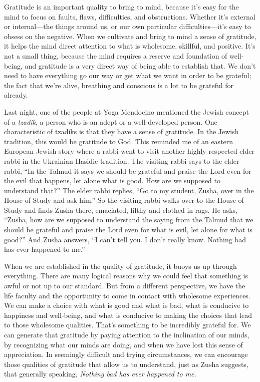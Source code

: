 Gratitude is an important quality to bring to mind, because it's easy 
for the mind to focus on faults, flaws, difficulties, and obstructions. 
Whether it's external or internal---the things around us, or our own 
particular difficulties---it's easy to obsess on the negative. When we 
cultivate and bring to mind a sense of gratitude, it helps the mind 
direct attention to what is wholesome, skillful, and positive. It's not 
a small thing, because the mind requires a reserve and foundation of 
well-being, and gratitude is a very direct way of being able to 
establish that. We don't need to have everything go our way or get what 
we want in order to be grateful; the fact that we're alive, breathing 
and conscious is a lot to be grateful for already.

Last night, one of the people at Yoga Mendocino mentioned the Jewish 
concept of a \emph{tzadik}, a person who is an adept or a 
well-developed person. One characteristic of tzadiks is that they have 
a sense of gratitude. In the Jewish tradition, this would be gratitude 
to God. This reminded me of an eastern European Jewish story where a 
rabbi went to visit another highly respected elder rabbi in the 
Ukrainian Hasidic tradition. The visiting rabbi says to the elder 
rabbi, ``In the Talmud it says we should be grateful and praise the 
Lord even for the evil that happens, let alone what is good. How are we 
supposed to \mbox{understand} that?'' The elder rabbi replies, ``Go to my 
student, Zusha, over in the House of Study and ask him.'' So the 
visiting rabbi walks over to the House of Study and finds Zusha there, 
emaciated, filthy and clothed in rags. He asks, ``Zusha, how are we 
supposed to understand the saying from the Talmud that we should be 
grateful and praise the Lord even for what is evil, let alone for what 
is good?'' And Zusha answers, ``I can't tell you. I don't really know. 
Nothing bad has ever happened to me.''

When we are established in the quality of gratitude, it buoys us up 
through everything. There are many logical reasons why we could feel 
that something is awful or not up to our standard. But from a different 
perspective, we have the life faculty and the opportunity to come in 
contact with wholesome experiences. We can make a choice with what is 
good and what is bad, what is conducive to happiness and well-being, 
and what is conducive to making the choices that lead to those 
wholesome qualities. That's something to be incredibly grateful for. We 
can generate that gratitude by paying attention to the inclination of 
our minds, by recognizing what our minds are doing, and when we have 
lost this sense of appreciation. In seemingly difficult and trying 
circumstances, we can encourage those qualities of gratitude that allow 
us to understand, just as Zusha suggests, that generally speaking, 
\emph{Nothing bad has ever happened to me.}

